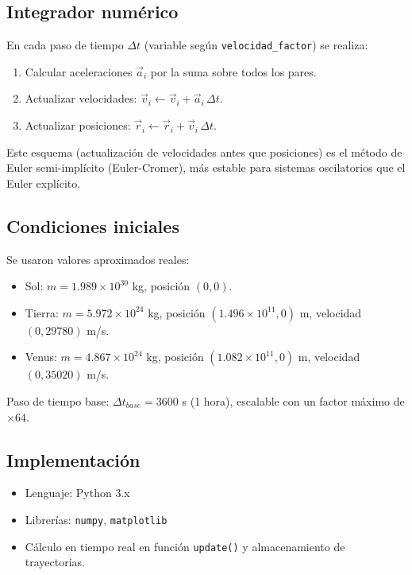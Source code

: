 \documentclass[12pt,a4paper]{article}
\begin{document}
\subsection{Integrador numérico}
En cada paso de tiempo $\Delta t$ (variable según \texttt{velocidad\_factor}) se realiza:
\begin{enumerate}
    \item Calcular aceleraciones $\vec{a}_i$ por la suma sobre todos los pares.
    \item Actualizar velocidades: $\vec{v}_i \leftarrow \vec{v}_i + \vec{a}_i \, \Delta t$.
    \item Actualizar posiciones: $\vec{r}_i \leftarrow \vec{r}_i + \vec{v}_i \, \Delta t$.
\end{enumerate}
Este esquema (actualización de velocidades antes que posiciones) es el método de Euler semi-implícito (Euler-Cromer), más estable para sistemas oscilatorios que el Euler explícito.

\subsection{Condiciones iniciales}
Se usaron valores aproximados reales:
\begin{itemize}
    \item Sol: $m = 1.989 \times 10^{30}$ kg, posición $(0,0)$.
    \item Tierra: $m = 5.972 \times 10^{24}$ kg, posición $(1.496\times 10^{11}, 0)$ m, velocidad $(0, 29780)$ m/s.
    \item Venus: $m = 4.867 \times 10^{24}$ kg, posición $(1.082\times 10^{11}, 0)$ m, velocidad $(0, 35020)$ m/s.
\end{itemize}
Paso de tiempo base: $\Delta t_{base} = 3600$ s (1 hora), escalable con un factor máximo de $\times 64$.

\subsection{Implementación}
\begin{itemize}
    \item Lenguaje: Python 3.x
    \item Librerías: \texttt{numpy}, \texttt{matplotlib}
    \item Cálculo en tiempo real en función \texttt{update()} y almacenamiento de trayectorias.
\end{itemize}
\end{document}
